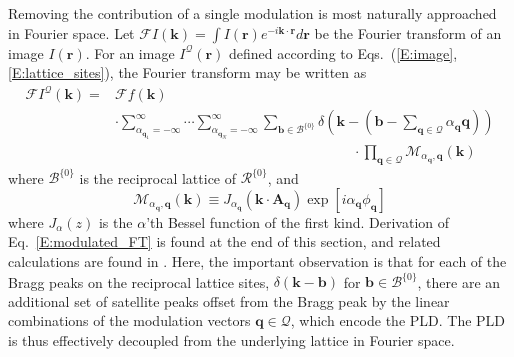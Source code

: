 \documentclass[12pt]{article}
\begin{document}
Removing the contribution of a single modulation is most naturally approached in Fourier space.
Let $\mathcal{F}I(\mathbf{k}) = \int I(\mathbf{r})e^{-i\mathbf{k}\cdot\mathbf{r}}d\mathbf{r}$ be the Fourier transform of an image $I(\mathbf{r})$.
For an image $I^\mathcal{Q}(\mathbf{r})$ defined according to Eqs.~(\ref{E:image},\ref{E:lattice_sites}), the Fourier transform may be written as
\begin{align}\label{E:modulated_FT}
    \mathcal{F}I^{\mathcal{Q}}(\mathbf{k}) =
        & \mathcal{F}f(\mathbf{k}) \nonumber \\
        & \cdot \sum_{\alpha_{\mathbf{q}_1}=-\infty}^{\infty} \cdots \sum_{\alpha_{\mathbf{q}_N}=-\infty}^{\infty} \sum_{\mathbf{b}\in\mathcal{B}^{\{0\}}}\delta\left(\mathbf{k}-\left(\mathbf{b}-\sum_{\mathbf{q}\in\mathcal{Q}}\alpha_{\mathbf{q}}\mathbf{q}\right)\right) \nonumber \\
        & \quad\qquad\qquad\qquad\qquad\qquad\qquad\qquad\qquad \cdot \prod_{\mathbf{q}\in\mathcal{Q}} \mathcal{M}_{\alpha_{\mathbf{q}},\mathbf{q}}(\mathbf{k}) 
\end{align}
where $\mathcal{B}^{\{0\}}$ is the reciprocal lattice of $\mathcal{R}^{\{0\}}$, and 
\begin{equation}\label{E:k_dot_A_factor}
    \mathcal{M}_{\alpha_{\mathbf{q}},\mathbf{q}}(\mathbf{k}) \equiv J_{\alpha_{\mathbf{q}}}\left(\mathbf{k}\cdot\mathbf{A}_{\mathbf{q}}\right) \exp\left[i\alpha_{\mathbf{q}}\phi_{\mathbf{q}}\right] 
\end{equation}
where $J_\alpha(z)$ is the $\alpha$'th Bessel function of the first kind.
Derivation of Eq.~\ref{E:modulated_FT} is found at the end of this section, and related calculations are found in \cite{Wilson1975,hovden2016atomic}.
Here, the important observation is that for each of the Bragg peaks on the reciprocal lattice sites, $\delta\left(\mathbf{k}-\mathbf{b}\right)$ for $\mathbf{b}\in\mathcal{B}^{\{0\}}$, there are an additional set of satellite peaks offset from the Bragg peak by the linear combinations of the modulation vectors $\mathbf{q}\in\mathcal{Q}$, which encode the PLD.
The PLD is thus effectively decoupled from the underlying lattice in Fourier space.
\end{document}
